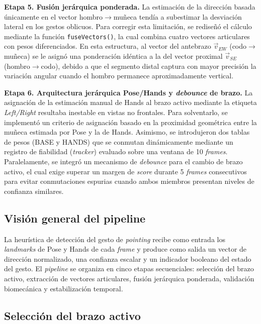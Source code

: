 \documentclass[12pt]{report} %
\begin{document}
\textbf{Etapa 5. Fusión jerárquica ponderada.} La estimación de la dirección basada únicamente en el vector hombro$\rightarrow$muñeca tendía a subestimar la desviación lateral en los gestos oblicuos. Para corregir esta limitación, se rediseñó el cálculo mediante la función \texttt{fuseVectors()}, la cual combina cuatro vectores articulares con pesos diferenciados. En esta estructura, al vector del antebrazo $\vec{v}_{EW}$ (codo$\rightarrow$muñeca) se le asignó una ponderación idéntica a la del vector proximal $\vec{v}_{SE}$ (hombro$\rightarrow$codo), debido a que el segmento distal captura con mayor precisión la variación angular cuando el hombro permanece aproximadamente vertical.

\textbf{Etapa 6. Arquitectura jerárquica Pose/Hands y \textit{debounce} de brazo.} La asignación de la estimación manual de Hands al brazo activo mediante la etiqueta \textit{Left/Right} resultaba inestable en vistas no frontales. Para solventarlo, se implementó un criterio de asignación basado en la proximidad geométrica entre la muñeca estimada por Pose y la de Hands. Asimismo, se introdujeron dos tablas de pesos (BASE y HANDS) que se conmutan dinámicamente mediante un registro de fiabilidad (\textit{tracker}) evaluado sobre una ventana de 10 \textit{frames}. Paralelamente, se integró un mecanismo de \textit{debounce} para el cambio de brazo activo, el cual exige superar un margen de \textit{score} durante 5 \textit{frames} consecutivos para evitar conmutaciones espurias cuando ambos miembros presentan niveles de confianza similares.

\subsection{Visión general del pipeline}

La heurística de detección del gesto de \textit{pointing} recibe como entrada los \textit{landmarks} de Pose y Hands de cada \textit{frame} y produce como salida un vector de dirección normalizado, una confianza escalar y un indicador booleano del estado del gesto. El \textit{pipeline} se organiza en cinco etapas secuenciales: selección del brazo activo, extracción de vectores articulares, fusión jerárquica ponderada, validación biomecánica y estabilización temporal.

\subsection{Selección del brazo activo}
\end{document}
